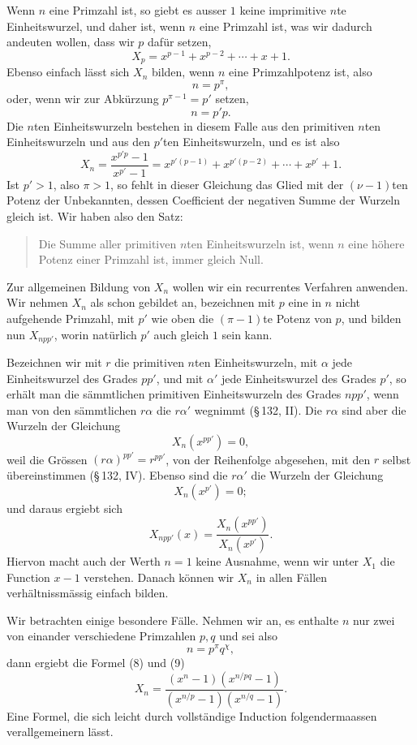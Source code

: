 \documentclass[11pt]{article}
\begin{document}
Wenn $n$ eine Primzahl ist, so giebt es ausser $1$ keine imprimitive $n$te Einheitswurzel, und daher ist, wenn $n$ eine Primzahl ist, was wir dadurch andeuten wollen, dass wir $p$ dafür setzen,
\[
\tag{7}        X_p=x^{p-1}+x^{p-2}+\cdots+x+1.
\]
Ebenso einfach lässt sich $X_n$ bilden, wenn $n$ eine Primzahlpotenz ist, also
\[
        n=p^\pi,
\]
oder, wenn wir zur Abkürzung $p^{\pi-1}=p'$ setzen,
\[
        n=p'p.
\]
Die $n$ten Einheitswurzeln bestehen in diesem Falle aus den primitiven $n$ten Einheitswurzeln und aus den $p'$ten Einheitswurzeln, und es ist also
\[
\tag{8}        X_n=\frac{x^{p'p}-1}{x^{p'}-1}=x^{p'(p-1)}+x^{p'(p-2)}+\cdots+x^{p'}+1.
\]
Ist $p'>1$, also $\pi>1$, so fehlt in dieser Gleichung das Glied mit der $(\nu-1)$ten Potenz der Unbekannten, dessen Coefficient der negativen Summe der Wurzeln gleich ist. Wir haben also den Satz:
\begin{quote}
Die Summe aller primitiven $n$ten Einheitswurzeln ist, wenn $n$ eine höhere Potenz einer Primzahl ist, immer gleich Null.
\end{quote}

Zur allgemeinen Bildung von $X_n$ wollen wir ein recurrentes Verfahren anwenden. Wir nehmen $X_n$ als schon gebildet an, bezeichnen mit $p$ eine in $n$ nicht aufgehende Primzahl, mit $p'$ wie oben die $(\pi-1)$te Potenz von $p$, und bilden nun $X_{npp'}$, worin natürlich $p'$ auch gleich $1$ sein kann.

Bezeichnen wir mit $r$ die primitiven $n$ten Einheitswurzeln, mit $\alpha$ jede Einheitswurzel des Grades $pp'$, und mit $\alpha'$ jede Einheitswurzel des Grades $p'$, so erhält man die sämmtlichen primitiven Einheitswurzeln des Grades $npp'$, wenn man von den sämmtlichen $r\alpha$ die $r\alpha'$ wegnimmt (\S\,132, II). Die $r\alpha$ sind aber die Wurzeln der Gleichung
\[
        X_n(x^{pp'})=0,
\]
weil die Grössen $(r\alpha)^{pp'}=r^{pp'}$, von der Reihenfolge abgesehen, mit den $r$ selbst übereinstimmen (\S\,132, IV). Ebenso sind die $r\alpha'$ die Wurzeln der Gleichung
\[
        X_n(x^{p'})=0;
\]
und daraus ergiebt sich
\[
\tag{9}        X_{npp'}(x)=\frac{X_n(x^{pp'})}{X_n(x^{p'})}.
\]
Hiervon macht auch der Werth $n=1$ keine Ausnahme, wenn wir unter $X_1$ die Function $x-1$ verstehen. Danach können wir $X_n$ in allen Fällen verhältnissmässig einfach bilden.

Wir betrachten einige besondere Fälle. Nehmen wir an, es enthalte $n$ nur zwei von einander verschiedene Primzahlen $p,q$ und sei also
\[
        n=p^\pi q^\chi,
\]
dann ergiebt die Formel (8) und (9)
\[
        X_n=\frac{(x^n-1)(x^{n/pq}-1)}{(x^{n/p}-1)(x^{n/q}-1)}.
\]
Eine Formel, die sich leicht durch vollständige Induction folgendermaassen verallgemeinern lässt.
\end{document}
